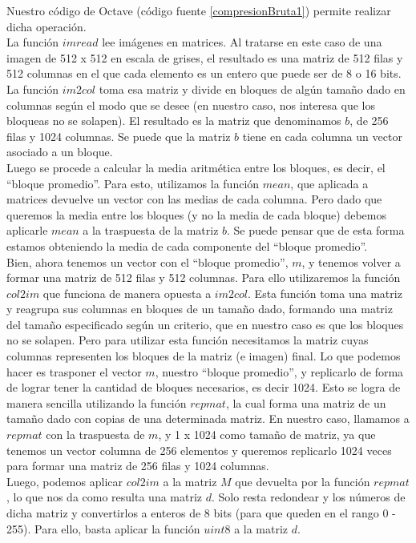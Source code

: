 \documentclass[twocolumn,a4paper,10pt]{article}
\begin{document}
Nuestro c\'odigo de Octave (c\'odigo fuente \ref{compresionBruta1}) permite realizar dicha operaci\'on. \\

La funci\'on $imread$ lee im\'agenes en matrices. Al tratarse en este caso de una imagen de 512 x 512 en escala de grises, el resultado es una matriz de 512 filas y 
512 columnas en el que cada elemento es un entero que puede ser de 8 o 16 bits. La funci\'on $im2col$ toma esa matriz y divide en bloques de alg\'un tamaño dado en 
columnas seg\'un el modo que se desee (en nuestro caso, nos interesa que los bloqueas no se solapen). El resultado es la matriz que denominamos $b$, de 256 filas y 
1024 columnas. Se puede que la matriz $b$ tiene en cada columna un vector asociado a un bloque.  \\

Luego se procede a calcular la media aritm\'etica entre los bloques, es decir, el ``bloque promedio''. Para esto, utilizamos la funci\'on $mean$, que aplicada a 
matrices devuelve un vector con las medias de cada columna. Pero dado que queremos la media entre los bloques (y no la media de cada bloque) debemos aplicarle
$mean$ a la traspuesta de la matriz $b$. Se puede pensar que de esta forma estamos obteniendo la media de cada componente del ``bloque promedio''. \\

Bien, ahora tenemos un vector con el ``bloque promedio'', $m$, y tenemos volver a formar una matriz de 512 filas y 512 columnas. Para ello utilizaremos la funci\'on
$col2im$ que funciona de manera opuesta a $im2col$. Esta funci\'on toma una matriz y reagrupa sus columnas en bloques de un tamaño dado, formando una matriz del 
tamaño especificado seg\'un un criterio, que en nuestro caso es que los bloques no se solapen. Pero para utilizar esta funci\'on necesitamos la matriz cuyas 
columnas representen los bloques de la matriz (e imagen) final. Lo que podemos hacer es trasponer el vector $m$, nuestro ``bloque promedio'', y replicarlo de forma
de lograr tener la cantidad de bloques necesarios, es decir 1024. Esto se logra de manera sencilla utilizando la funci\'on $repmat$, la cual forma una matriz de un
tamaño dado con copias de una determinada matriz. En nuestro caso, llamamos a $repmat$ con la traspuesta de $m$, y 1 x 1024 como tamaño de matriz, ya que tenemos un 
vector columna de 256 elementos y queremos replicarlo 1024 veces para formar una matriz de 256 filas y 1024 columnas.\\

Luego, podemos aplicar $col2im$ a la matriz $M$ que devuelta por la funci\'on $repmat$, lo que nos da como resulta una matriz $d$. Solo resta redondear y los n\'umeros 
de dicha matriz y convertirlos a enteros de 8 bits (para que queden en el rango 0 - 255). Para ello, basta aplicar la funci\'on $uint8$ a la matriz $d$.
\end{document}
